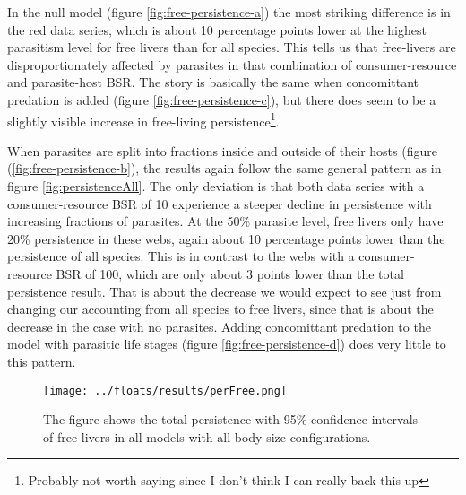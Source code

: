 \documentclass[11pt]{amsart}
\begin{document}
In the null model (figure \ref{fig:free-persistence-a}) the most striking difference is in the red data series, which is about 10 percentage points lower at the highest parasitism level for free livers than for all species.  This tells us that free-livers are disproportionately affected by parasites in that combination of consumer-resource and parasite-host BSR.  The story is basically the same when concomittant predation is added (figure \ref{fig:free-persistence-c}), but there does seem to be a slightly visible increase in free-living persistence\footnote{Probably not worth saying since I don't think I can really back this up}.   

When parasites are split into fractions inside and outside of their hosts (figure (\ref{fig:free-persistence-b}), the results again follow the same general pattern as in figure \ref{fig:persistenceAll}.  The only deviation is that both data series with a consumer-resource BSR of 10 experience a steeper decline in persistence with increasing fractions of parasites.  At the 50\% parasite level, free livers only have 20\% persistence in these webs, again about 10 percentage points lower than the persistence of all species. This is in contrast to the webs with a consumer-resource BSR of 100, which are only about 3 points lower than the total persistence result.  That is about the decrease we would expect to see just from changing our accounting from all species to free livers, since that is about the decrease in the case with no parasites.  Adding concomittant predation to the model with parasitic life stages (figure \ref{fig:free-persistence-d}) does very little to this pattern. 

\begin{figure}[h] 
\captionsetup[subfigure]{labelfont = it, textfont = it,labelformat = parens,labelsep = space}
    \begin{minipage}{.45\textwidth}
    \end{minipage}
    \begin{minipage}{.45\textwidth}
    \end{minipage}
    \texttt{[image: ../floats/results/perFree.png]}
\caption{The figure shows the total persistence with 95\% confidence intervals of free livers in all models with all body size configurations.}
    \begin{minipage}{.45\textwidth}
    \end{minipage}
    \begin{minipage}{.45\textwidth}
    \end{minipage}
\label{fig:persistenceFree}
\end{figure}
\end{document}
